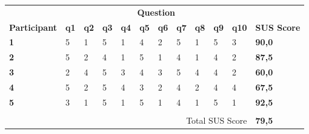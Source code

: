 \begin{table}[ht]
    \centering
    \begin{tabular}{llllllllllll}
    \rowcolor[HTML]{FFFFFF} 
                         & \multicolumn{10}{c}{\cellcolor[HTML]{FFFFFF}\textbf{Question}}                                                                             & \textbf{}          \\
    \rowcolor[HTML]{FFFFFF} 
    \textbf{Participant} & \textbf{q1} & \textbf{q2} & \textbf{q3} & \textbf{q4} & \textbf{q5} & \textbf{q6} & \textbf{q7} & \textbf{q8} & \textbf{q9} & \textbf{q10} & \textbf{SUS Score} \\
    \rowcolor[HTML]{FFFFFF} 
    \textbf{1}           & 5           & 1           & 5           & 1           & 4           & 2           & 5           & 1           & 5           & 3            & \textbf{90,0}      \\
    \rowcolor[HTML]{FFFFFF} 
    \textbf{2}           & 5           & 2           & 4           & 1           & 5           & 1           & 4           & 1           & 4           & 2            & \textbf{87,5}      \\
    \rowcolor[HTML]{FFFFFF} 
    \textbf{3}           & 2           & 4           & 5           & 3           & 4           & 3           & 5           & 4           & 4           & 2            & \textbf{60,0}      \\
    \rowcolor[HTML]{FFFFFF} 
    \textbf{4}           & 5           & 2           & 5           & 4           & 3           & 2           & 4           & 2           & 4           & 4            & \textbf{67,5}      \\
    \rowcolor[HTML]{FFFFFF} 
    \textbf{5}           & 3           & 1           & 5           & 1           & 5           & 1           & 4           & 1           & 5           & 1            & \textbf{92,5}      \\
    \rowcolor[HTML]{FFFFFF} 
                         & \multicolumn{10}{l}{\cellcolor[HTML]{FFFFFF}}                                                                                              & \textbf{}          \\
    \rowcolor[HTML]{FFFFFF} 
                         & \multicolumn{10}{r}{\cellcolor[HTML]{FFFFFF}Total SUS Score}                                                                               & \textbf{79,5}      \\

\end{tabular}
\end{table}
